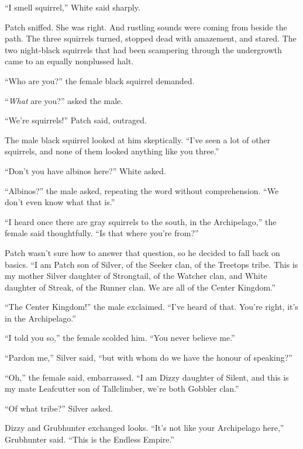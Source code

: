 \documentclass[ebook,oneside,openany,17pt]{memoir}
\newenvironment{tolerant}[1]{%
  \par\tolerance=#1\relax
}{%
  \par
}
\begin{document}
“I smell squirrel,” White said sharply.

\begin{tolerant}{5000}
Patch sniffed. She was right. And rustling sounds were coming from
beside the path. The three squirrels turned, stopped dead with
amazement, and stared. The two night-black squirrels that had been
scampering through the undergrowth came to an equally nonplussed halt.
\end{tolerant}

\begin{tolerant}{1000}
“Who are you?” the female black squirrel demanded.
\end{tolerant}

“\emph{What} are you?” asked the male.

“We’re squirrels!” Patch said, outraged.

The male black squirrel looked at him skeptically. “I’ve seen a lot of
other squirrels, and none of them looked anything like you three.”

“Don’t you have albinos here?” White asked.

“Albinos?” the male asked, repeating the word without
comprehension. “We don’t even know what that is.”

“I heard once there are gray squirrels to the south, in the
Archipelago,” the female said thoughtfully. “Is that where you’re
from?”

Patch wasn’t sure how to answer that question, so he decided to fall
back on basics. “I am Patch son of Silver, of the Seeker clan, of the
Treetops tribe. This is my mother Silver daughter of Strongtail, of
the Watcher clan, and White daughter of Streak, of the Runner clan. We
are all of the Center Kingdom.”

“The Center Kingdom!” the male exclaimed. “I’ve heard of that. You’re
right, it’s in the Archipelago.”

\begin{tolerant}{1000}
“I told you so,” the female scolded him. “You never believe me.”
\end{tolerant}

“Pardon me,” Silver said, “but with whom do we have the honour of
speaking?”

“Oh,” the female said, embarrassed. “I am Dizzy daughter of Silent,
and this is my mate Leafcutter son of Tallclimber, we’re both Gobbler
clan.”

“Of what tribe?” Silver asked.

Dizzy and Grubhunter exchanged looks. “It’s not like your Archipelago
here,” Grubhunter said. “This is the Endless Empire.”
\end{document}
